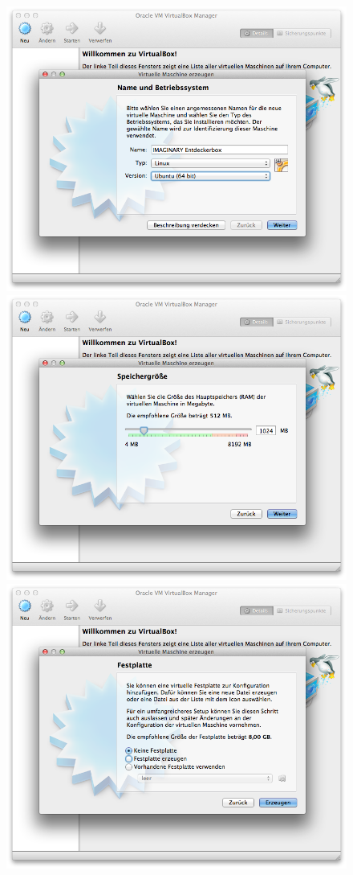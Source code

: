\documentclass[a4paper,10pt,BCOR=0mm,DIV=14]{scrartcl}
\def\gfxscale{0.27}
\begin{document}
\begin{figure}[h]
\centering
\includegraphics[scale=\gfxscale]{VBox20}
\qquad
\centering\includegraphics[scale=\gfxscale]{VBox30}
\\[\bigskipamount]
\includegraphics[scale=\gfxscale]{VBox40}

\end{figure}
\end{document}

